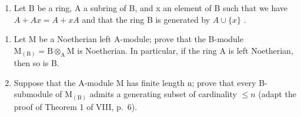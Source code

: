 \begin{enumerate}
\def\labelenumi{\arabic{enumi})}
\setcounter{enumi}{27}
\tightlist
\item
  Let B be a ring, A a subring of B, and x an element of B such that we have \(A + Ax = A + xA\) and that the ring B is generated by \(A \cup \{x\}\) .
\end{enumerate}

\begin{enumerate}
\def\labelenumi{\alph{enumi})}
\item
  Let M be a Noetherian left A-module; prove that the B-module \(\mathrm{M}_{(\mathrm{B})} = \mathrm{B} \otimes_{\mathrm{A}} \mathrm{M}\) is Noetherian. In particular, if the ring A is left Noetherian, then so is B.
\item
  Suppose that the A-module M has finite length n; prove that every B-submodule of \(\mathrm{M}_{(\mathrm{B})}\) admits a generating subset of cardinality \(\leqslant n\) (adapt the proof of Theorem 1 of VIII, p.~6).
\end{enumerate}

